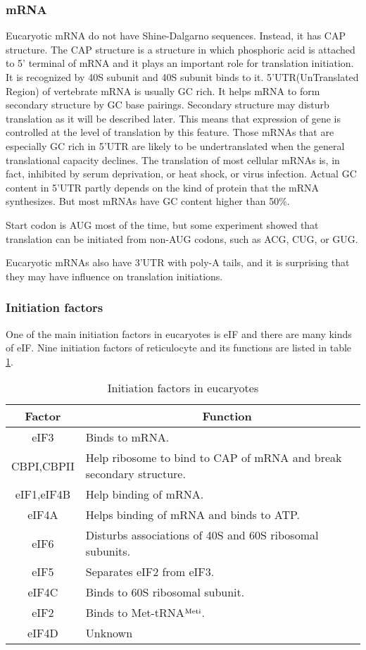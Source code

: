 \subsubsection{mRNA}
Eucaryotic mRNA do not have Shine-Dalgarno sequences. Instead,
it has CAP structure. The CAP structure is a structure in
which phosphoric acid is attached to 5' terminal of mRNA
and it plays an important role for translation initiation. 
It is recognized by 40S subunit and 40S subunit binds to it.
5'UTR(UnTranslated Region) of vertebrate mRNA is usually GC rich.
It helps mRNA to form secondary structure by GC base pairings.
Secondary structure may disturb translation as it will be
described later. This means that expression of gene is controlled 
at the level of translation by this feature. Those mRNAs that are 
especially GC rich in 5'UTR are likely to be undertranslated when the general 
translational capacity declines. The translation of most cellular 
mRNAs is, in fact, inhibited by serum deprivation, or heat shock, or
virus infection. Actual GC content in 5'UTR partly depends on the kind of
protein that the mRNA synthesizes. But most mRNAs have GC content higher
than 50\%. 

Start codon is AUG most of the time, but some experiment showed
that translation can be initiated from non-AUG codons, such as
ACG, CUG, or GUG\cite{label6}\cite{label29}.

Eucaryotic mRNAs also have 3'UTR with poly-A tails, and it is
surprising that they may have influence on translation
initiations\cite{label1920}.

\subsubsection{Initiation factors}
One of the main initiation factors in eucaryotes is eIF and there are
many kinds of eIF. Nine initiation factors of reticulocyte and its
functions are listed in table \ref{eif}.
\begin{table}
\begin{tabular}{|c|l|}
\hline
Factor & ~~~~~~~~~~~~~~~~~~Function\\
\hline
eIF3 & Binds to mRNA.\\
CBPI,CBPII & Help ribosome to bind to CAP of mRNA and break secondary structure. \\
eIF1,eIF4B & Help binding of mRNA.\\
eIF4A & Helps binding of mRNA and binds to ATP.\\
eIF6 & Disturbs associations of 40S and 60S ribosomal subunits.\\ 
eIF5 & Separates eIF2 from eIF3.\\
eIF4C & Binds to 60S ribosomal subunit.\\
eIF2 & Binds to Met-tRNA$^{\rm Meti}$.\\
eIF4D& Unknown \\
\hline
\end{tabular}
\caption{Initiation factors in eucaryotes}
\label{eif}
\end{table}

